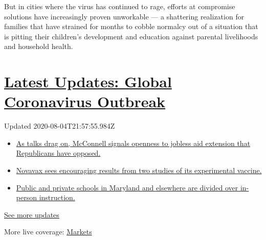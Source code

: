 But in cities where the virus has continued to rage, efforts at
compromise solutions have increasingly proven unworkable --- a
shattering realization for families that have strained for months to
cobble normalcy out of a situation that is pitting their children's
development and education against parental livelihoods and household
health.

\hypertarget{latest-updates-global-coronavirus-outbreak}{%
\section{\texorpdfstring{\href{https://www.nytimes3xbfgragh.onion/2020/08/04/world/coronavirus-cases.html?action=click\&pgtype=Article\&state=default\&region=MAIN_CONTENT_1\&context=storylines_live_updates}{Latest
Updates: Global Coronavirus
Outbreak}}{Latest Updates: Global Coronavirus Outbreak}}\label{latest-updates-global-coronavirus-outbreak}}

Updated 2020-08-04T21:57:55.984Z

\begin{itemize}
\tightlist
\item
  \href{https://www.nytimes3xbfgragh.onion/2020/08/04/world/coronavirus-cases.html?action=click\&pgtype=Article\&state=default\&region=MAIN_CONTENT_1\&context=storylines_live_updates\#link-2daa96b5}{As
  talks drag on, McConnell signals openness to jobless aid extension
  that Republicans have opposed.}
\item
  \href{https://www.nytimes3xbfgragh.onion/2020/08/04/world/coronavirus-cases.html?action=click\&pgtype=Article\&state=default\&region=MAIN_CONTENT_1\&context=storylines_live_updates\#link-1228a480}{Novavax
  sees encouraging results from two studies of its experimental
  vaccine.}
\item
  \href{https://www.nytimes3xbfgragh.onion/2020/08/04/world/coronavirus-cases.html?action=click\&pgtype=Article\&state=default\&region=MAIN_CONTENT_1\&context=storylines_live_updates\#link-4825b93}{Public
  and private schools in Maryland and elsewhere are divided over
  in-person instruction.}
\end{itemize}

\href{https://www.nytimes3xbfgragh.onion/2020/08/04/world/coronavirus-cases.html?action=click\&pgtype=Article\&state=default\&region=MAIN_CONTENT_1\&context=storylines_live_updates}{See
more updates}

More live coverage:
\href{https://www.nytimes3xbfgragh.onion/live/2020/08/04/business/stock-market-today-coronavirus?action=click\&pgtype=Article\&state=default\&region=MAIN_CONTENT_1\&context=storylines_live_updates}{Markets}

